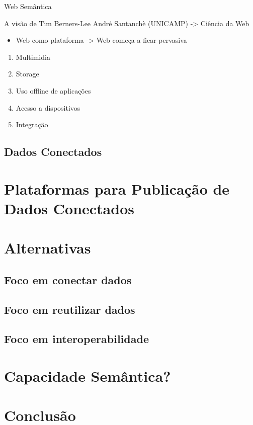 \documentclass[brazil,aspectratio=169]{lapesd-slides}
\begin{document}
\begin{frame}{Web Semântica}
	\begin{block}{A visão de Tim Berners-Lee}
		André Santanchè (UNICAMP) -> Ciência da Web
		\begin{itemize}
			\item Web como plataforma -> Web começa a ficar pervasiva
		\end{itemize}
		\begin{enumerate}
			\item Multimidia
			\item Storage 
			\item Uso offline de aplicações 
			\item Acesso a dispositivos
			\item Integração 
		\end{enumerate}
	\end{block}
	
\end{frame}





\subsection{Dados Conectados}
\section{Plataformas para Publicação de Dados Conectados}
\section{Alternativas}
\subsection{Foco em conectar dados}
\subsection{Foco em reutilizar dados}
\subsection{Foco em interoperabilidade}
\section{Capacidade Semântica?}
\section{Conclusão}














\thanksframe
{}

\begin{backup}
\end{backup}
\end{document}

